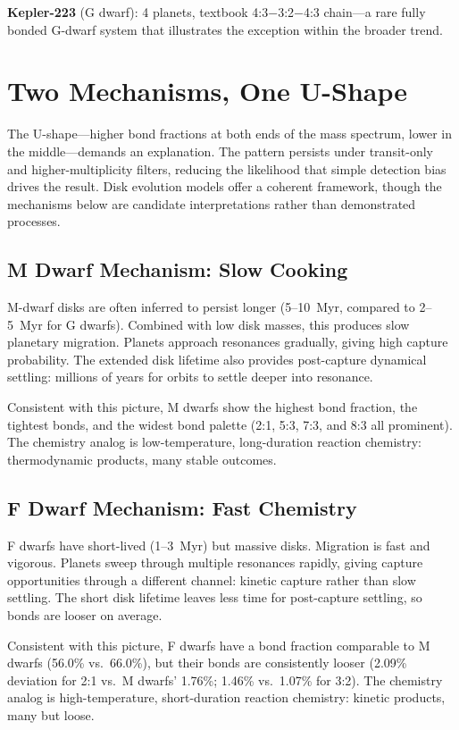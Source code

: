 \documentclass[twocolumn]{aastex631}
\begin{document}
\textbf{Kepler-223} (G dwarf): 4 planets, textbook 4:3$-$3:2$-$4:3 chain---a
rare fully bonded G-dwarf system that illustrates the exception within the
broader trend.

\section{Two Mechanisms, One U-Shape}
\label{sec:mechanisms}

The U-shape---higher bond fractions at both ends of the mass spectrum, lower
in the middle---demands an explanation. The pattern persists under transit-only and higher-multiplicity filters, reducing
the likelihood that simple detection bias drives the result.
Disk evolution models offer a coherent framework, though the mechanisms below are
candidate interpretations rather than demonstrated processes.

\subsection{M Dwarf Mechanism: Slow Cooking}

M-dwarf disks are often inferred to persist longer (5--10~Myr, compared to
2--5~Myr for G dwarfs)\citep{yasui2010,haisch2001}. Combined with low disk
masses, this produces slow planetary migration. Planets approach resonances
gradually, giving high capture probability. The extended disk lifetime also
provides post-capture dynamical settling: millions of years for orbits to settle
deeper into resonance.

Consistent with this picture, M dwarfs show the highest bond fraction, the
tightest bonds, and the widest bond palette (2:1, 5:3, 7:3, and 8:3 all
prominent). The chemistry analog is low-temperature, long-duration reaction
chemistry: thermodynamic products, many stable outcomes.

\subsection{F Dwarf Mechanism: Fast Chemistry}

F dwarfs have short-lived (1--3~Myr) but massive disks\citep{sicilia_aguilar}.
Migration is fast and vigorous. Planets sweep through multiple resonances
rapidly, giving capture opportunities through a different channel: kinetic
capture rather than slow settling. The short disk lifetime leaves less time for
post-capture settling, so bonds are looser on average.

Consistent with this picture, F dwarfs have a bond fraction comparable to M
dwarfs (56.0\% vs.\ 66.0\%), but their bonds are consistently looser (2.09\%
deviation for 2:1 vs.\ M dwarfs' 1.76\%; 1.46\% vs.\ 1.07\% for 3:2). The
chemistry analog is high-temperature, short-duration reaction chemistry:
kinetic products, many but loose.
\end{document}
